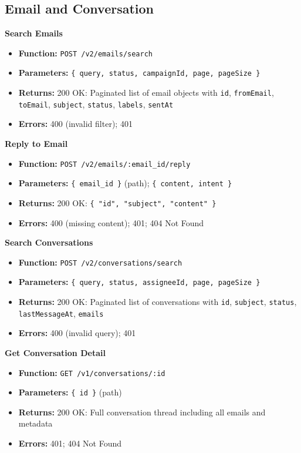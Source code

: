 \documentclass[a4paper]{article}
\begin{document}
\subsection{Email and Conversation}

\textbf{Search Emails}
\begin{itemize}
  \item \textbf{Function:} \texttt{POST /v2/emails/search}
  \item \textbf{Parameters:} \texttt{\{ query, status, campaignId, page, pageSize \}}
  \item \textbf{Returns:} 200 OK: Paginated list of email objects with \texttt{id}, \texttt{fromEmail}, \texttt{toEmail}, \texttt{subject}, \texttt{status}, \texttt{labels}, \texttt{sentAt}
  \item \textbf{Errors:} 400 (invalid filter); 401
\end{itemize}

\textbf{Reply to Email}
\begin{itemize}
  \item \textbf{Function:} \texttt{POST /v2/emails/:email\_id/reply}
  \item \textbf{Parameters:} \texttt{\{ email\_id \}} (path); \texttt{\{ content, intent \}}
  \item \textbf{Returns:} 200 OK: \texttt{\{ "id", "subject", "content" \}}
  \item \textbf{Errors:} 400 (missing content); 401; 404 Not Found
\end{itemize}

\textbf{Search Conversations}
\begin{itemize}
  \item \textbf{Function:} \texttt{POST /v2/conversations/search}
  \item \textbf{Parameters:} \texttt{\{ query, status, assigneeId, page, pageSize \}}
  \item \textbf{Returns:} 200 OK: Paginated list of conversations with \texttt{id}, \texttt{subject}, \texttt{status}, \texttt{lastMessageAt}, \texttt{emails}
  \item \textbf{Errors:} 400 (invalid query); 401
\end{itemize}

\textbf{Get Conversation Detail}
\begin{itemize}
  \item \textbf{Function:} \texttt{GET /v1/conversations/:id}
  \item \textbf{Parameters:} \texttt{\{ id \}} (path)
  \item \textbf{Returns:} 200 OK: Full conversation thread including all emails and metadata
  \item \textbf{Errors:} 401; 404 Not Found
\end{itemize}
\end{document}

